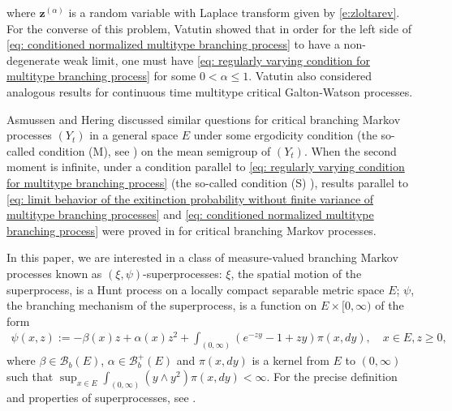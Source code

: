 \documentclass[12pt,a4paper]{amsart}
\theoremstyle{definition}
\numberwithin{equation}{section}
\begin{document}
where $\mathbf z^{(\alpha)}$ is a random variable with Laplace transform given by \eqref{e:zloltarev}.
For the converse of this problem, Vatutin \cite{Vatutin1977Limit} showed that in order for the left side of \eqref{eq: conditioned normalized multitype branching process} to have a non-degenerate weak limit, one must have \eqref{eq: regularly varying condition for multitype branching process} for some $0 < \alpha \leq 1$.
Vatutin \cite{Vatutin1977Limit} also considered analogous results for 
continuous time multitype critical Galton-Watson processes.
	
Asmussen and Hering \cite[Sections~6.3~and~6.4]{AsmussenHering1983Branching} discussed similar questions for critical branching Markov processes $(Y_t)$ in a general space $E$ under some ergodicity condition (the so-called condition (M), see \cite[p.~156]{AsmussenHering1983Branching}) on the mean semigroup of $(Y_t)$.
When the second moment is infinite, under a condition  parallel  to \eqref{eq: regularly varying condition for multitype branching process} (the so-called condition (S) \cite[p.~207]{AsmussenHering1983Branching}), results parallel to \eqref{eq: limit behavior of the exitinction probability without finite variance of multitype branching processes} and \eqref{eq: conditioned normalized multitype branching process} were proved in \cite[Theorem~6.4.2]{AsmussenHering1983Branching} for critical branching Markov processes.

In this paper, we are interested in a class of measure-valued branching Markov 
processes known as $(\xi, \psi)$-superprocesses:
$\xi$, the spatial motion of the superprocess, is a Hunt process on a locally compact separable metric space $E$;
$\psi$, the branching mechanism of the superprocess, is a function on $E \times [0,\infty)$ of the form
\begin{align} \label{eq: branching mechanism}
	\psi(x,z):=
	- \beta(x) z + \alpha (x) z^2 + \int_{(0,\infty)} (e^{-zy} - 1 + zy) \pi(x,dy),
	\quad x\in E, z\geq 0,
\end{align}
where $\beta \in \mathscr B_b(E)$, $\alpha \in \mathscr B^+_b(E)$ and $\pi(x,dy)$ is a kernel from $E$ to $(0,\infty)$ such that $\sup_{x\in E} \int_{(0,\infty)} (y\wedge y^2) \pi(x,dy) < \infty$.
For the precise definition and properties of superprocesses, see \cite{Li2011Measure-valued}.
\end{document}
